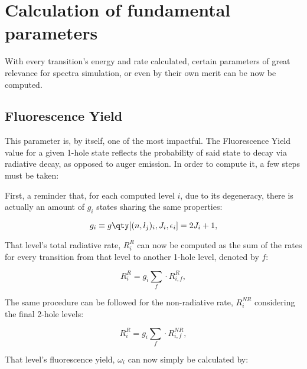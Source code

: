 
%

\chapter{Calculation of fundamental parameters}

With every transition's energy and rate calculated, certain parameters of great relevance for spectra simulation, or even by their own merit can be now be computed. 

\section{Fluorescence Yield}

This parameter is, by itself, one of the most impactful. The Fluorescence Yield value for a given 1-hole state reflects the probability of said state to decay via radiative decay, as opposed to auger emission. In order to compute it, a few steps must be taken:

First, a reminder that, for each computed level $i$, due to its degeneracy, there is actually an amount of $g_i$ states sharing the same properties:

\begin{equation}
    g_i\equiv g\qty[(n,l_j)_i,J_i,\epsilon_i]=2J_i+1,
    \label{eq:degen}
\end{equation}

That level's total radiative rate, $R_i^{R}$ can now be computed as the sum of the rates for every transition from that level to another 1-hole level, denoted by $f$:

\begin{equation}
    R_i^{R} = g_i \sum_f \cdot R_{i,f}^{R},
\end{equation}

The same procedure can be followed for the non-radiative rate, $R_i^{NR}$ considering the final 2-hole levels:

\begin{equation}
    R_i^{R} = g_i \sum_f \cdot R_{i,f}^{NR},
\end{equation}

That level's fluorescence yield, $\omega_i$ can now simply be calculated by:


